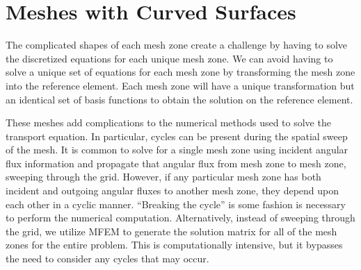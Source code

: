 \documentclass[12pt]{article}
\begin{document}
\section{Meshes with Curved Surfaces}
The complicated shapes of each mesh zone create a challenge by having to solve the discretized equations for each unique mesh zone. We can avoid having to solve a unique set of equations for each mesh zone by transforming the mesh zone into the reference element. Each mesh zone will have a unique transformation but an identical set of basis functions to obtain the solution on the reference element.

{\color{red}
These meshes add complications to the numerical methods used to solve the transport equation. In particular, cycles can be present during the spatial sweep of the mesh. It is common to solve for a single mesh zone using incident angular flux information and propagate that angular flux from mesh zone to mesh zone, sweeping through the grid. However, if any particular mesh zone has both incident and outgoing angular fluxes to another mesh zone, they depend upon each other in a cyclic manner. ``Breaking the cycle'' is some fashion is necessary to perform the numerical computation. Alternatively, instead of sweeping through the grid, we utilize MFEM to generate the solution matrix for all of the mesh zones for the entire problem. This is computationally intensive, but it bypasses the need to consider any cycles that may occur.
}

\end{document}
